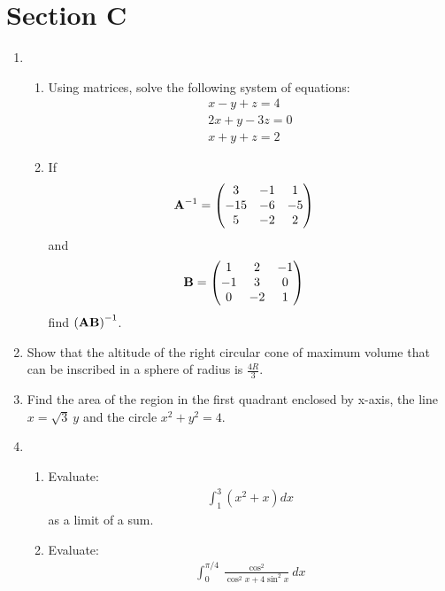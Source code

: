 \documentclass[journal,12pt,twocolumn]{IEEEtran}
\renewcommand\thesection{\arabic{section}}
\begin{document}
\section{Section C}
\renewcommand{\theequation}{\theenumi}
\begin{enumerate}[label=\thesection.\arabic*.,ref=\thesection.\theenumi]
\item \begin{enumerate}
\item Using matrices, solve the following system of equations:\\
\begin{align}
x-y+z=4\nonumber \\ 2x+y-3z=0\nonumber\\ x+y+z=2 \nonumber
\end{align}
\item If 
\begin{align}
\mathbf{A}^{-1}&=\begin{pmatrix}3&-1&1\\-15&-6&-5\\5&-2&2\end{pmatrix} \nonumber
\end{align}
and 
\begin{align}
\mathbf{B}&=\begin{pmatrix}1&2&-1\\-1&3&0\\0&-2&1\end{pmatrix} \nonumber
\end{align}
find $\mathbf{\left(AB\right)}^{-1}$.\\
\end{enumerate}
\item Show that the altitude of the right circular cone of maximum volume that can be inscribed in a sphere of radius is $\frac{4R}{3}$.\\
\item Find the area of the region in the first quadrant enclosed by x-axis, the line $x = \sqrt{3}\ y$ and the circle $x^{2}+y^{2}=4$. \\
\item 
\begin{enumerate}
\item Evaluate:\\
\begin{align}
    \int_{1}^{3}(x^{2}+x)dx \nonumber
\end{align}
 as a limit of a sum.
\item Evaluate: \\
\begin{align}
    \int_{0}^{\pi/4}\frac{\cos^{2}}{\cos^{2}x+4\sin^{2}x}dx \nonumber
\end{align}

\end{enumerate}
\end{enumerate}
\end{document}
